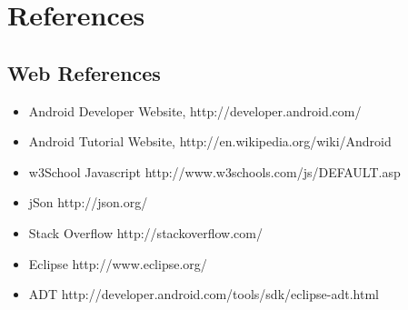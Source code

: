 \documentclass[12pt]{report}
\begin{document}
\chapter{References}

\section{Web References}

\begin{itemize}
\item Android Developer Website, http://developer.android.com/
\item Android Tutorial Website, http://en.wikipedia.org/wiki/Android
\item w3School Javascript http://www.w3schools.com/js/DEFAULT.asp
\item jSon http://json.org/
\item Stack Overflow http://stackoverflow.com/
\item Eclipse http://www.eclipse.org/
\item ADT http://developer.android.com/tools/sdk/eclipse-adt.html

\end{itemize}





\end{document}
